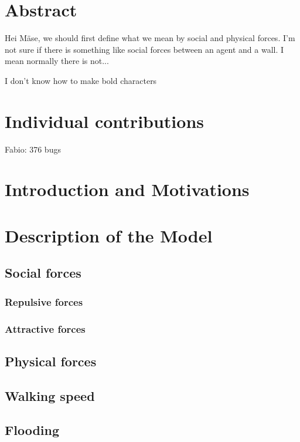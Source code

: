 \documentclass[11pt]{article}
\begin{document}
\newpage




\section{Abstract}

Hei M\"ase, we should first define what we mean by social and physical forces. I'm not sure if there is something like social forces between an agent and a wall. I mean normally there is not...

I don't know how to make bold characters

\section{Individual contributions}

Fabio: 376 bugs

\section{Introduction and Motivations}

\section{Description of the Model}

\subsection{Social forces}
\subsubsection{Repulsive forces}
\subsubsection{Attractive forces}
\subsection{Physical forces}
\subsection{Walking speed}
\subsection{Flooding}
\end{document}
